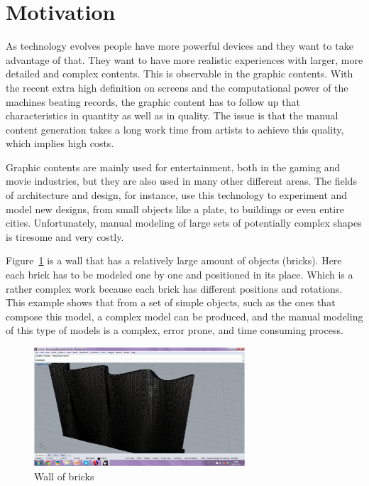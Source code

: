 
\section{Motivation} %
\label{sec:motivation}

As technology evolves people have more powerful devices and they want to take advantage of that. They want to have more realistic experiences with larger, more detailed and complex contents.
This is observable in the graphic contents. With the recent extra high definition on screens and the computational power of the machines beating records, the graphic content has to follow up that characteristics in quantity as well as in quality. The issue is that the manual content generation takes a long work time from artists to achieve this quality, which implies high costs.

Graphic contents are mainly used for entertainment, both in the gaming and movie industries, but they are also used in many other different areas. The fields of architecture and design, for instance, use this technology to experiment and model new designs, from small objects like a plate, to buildings or even entire cities. Unfortunately, manual modeling of large sets of potentially complex shapes is tiresome and very costly. 

Figure~\ref{fig:brickwall} is a wall that has a relatively large amount of objects (bricks). Here each brick has to be modeled one by one and positioned in its place. Which is a rather complex work because each brick has different positions and rotations. This example shows that from a set of simple objects, such as the ones that compose this model, a complex model can be produced, and the manual modeling of this type of models is a complex, error prone, and time consuming process.

\begin{figure}[htbp]
	\centering
	\includegraphics[width=0.7\textwidth, trim = 20mm 25mm 80mm 28mm, clip]{images/parede-sin.png}
	\caption{Wall of bricks}
	\label{fig:brickwall}
\end{figure}


